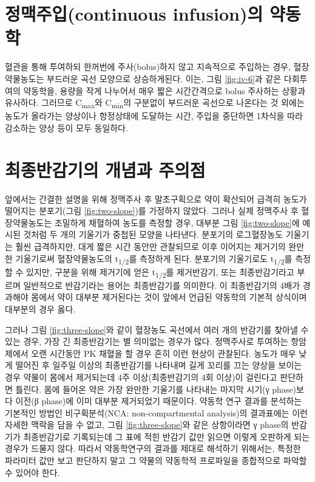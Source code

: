 \documentclass[
  11pt,
  krantz2, a4paper, twoside]{krantz}
\begin{document}
\hypertarget{uxc815uxb9e5uxc8fcuxc785continuous-infusionuxc758-uxc57duxb3d9uxd559}{%
\section{정맥주입(continuous infusion)의 약동학}\label{uxc815uxb9e5uxc8fcuxc785continuous-infusionuxc758-uxc57duxb3d9uxd559}}

혈관을 통해 투여하되 한꺼번에 주사(bolus)하지 않고 지속적으로 주입하는
경우, 혈장약물농도는 부드러운 곡선 모양으로 상승하게된다. 이는, 그림 \ref{fig:iv-6}과 같은 다회투여의 약동학을, 용량을 작게 나누어서 매우 짧은
시간간격으로 bolus 주사하는 상황과 유사하다. 그러므로 C\textsubscript{max}와 C\textsubscript{min}의
구분없이 부드러운 곡선으로 나온다는 것 외에는 농도가 올라가는 양상이나
항정상태에 도달하는 시간, 주입을 중단하면 1차식을 따라 감소하는 양상
등이 모두 동일하다.

\hypertarget{uxcd5cuxc885uxbc18uxac10uxae30uxc758-uxac1cuxb150uxacfc-uxc8fcuxc758uxc810}{%
\section{최종반감기의 개념과 주의점}\label{uxcd5cuxc885uxbc18uxac10uxae30uxc758-uxac1cuxb150uxacfc-uxc8fcuxc758uxc810}}

앞에서는 간결한 설명을 위해 정맥주사 후 말초구획으로 약이 확산되어
급격히 농도가 떨어지는 분포기(그림 \ref{fig:two-slope})를 가정하지 않았다. 그러나 실제
정맥주사 후 혈장약물농도는 조밀하게 채혈하여 농도를 측정할 경우, 대부분
그림 \ref{fig:two-slope}에 예시된 것처럼 두 개의 기울기가 중첩된 모양을 나타낸다.
분포기의 로그혈장농도 기울기는 훨씬 급격하지만, 대게 짧은 시간 동안만
관찰되므로 이후 이어지는 제거기의 완만한 기울기로써 혈장약물농도의
t\textsubscript{1/2}를 측정하게 된다. 분포기의 기울기로도 t\textsubscript{1/2}를 측정할 수 있지만,
구분을 위해 제거기에 얻은 t\textsubscript{1/2}를 제거반감기, 또는 최종반감기라고
부르며 일반적으로 반감기라는 용어는 최종반감기를 의미한다. 이
최종반감기의 4배가 경과해야 몸에서 약이 대부분 제거된다는 것이 앞에서
언급된 약동학의 기본적 상식이며 대부분의 경우 옳다.

그러나 그림 \ref{fig:three-slope}와 같이 혈장농도 곡선에서 여러 개의 반감기를 찾아낼 수
있는 경우, 가장 긴 최종반감기는 별 의미없는 경우가 많다. 정맥주사로
투여하는 항암제에서 오랜 시간동안 PK 채혈을 할 경우 흔히 이런 현상이
관찰된다. 농도가 매우 낮게 떨어진 후 일주일 이상의 최종반감기를 나타내며
길게 꼬리를 끄는 양상을 보이는 경우 약물이 몸에서 제거되는데 4주
이상(최종반감기의 4회 이상)이 걸린다고 판단하면 틀린다. 몸에 들어온 약은
가장 완만한 기울기를 나타내는 마지막 시기(γ phase)보다 이전(β phase)에
이미 대부분 제거되었기 때문이다. 약동학 연구 결과를 분석하는 기본적인
방법인 비구획분석(NCA: non-compartmental analysis)의 결과표에는 이런
자세한 맥락을 담을 수 없고, 그림 \ref{fig:three-slope}와 같은 상항이라면 γ phase의
반감기가 최종반감기로 기록되는데 그 표에 적힌 반감기 값만 읽으면 이렇게
오판하게 되는 경우가 드물지 않다. 따라서 약동학연구의 결과를 제대로
해석하기 위해서는, 특정한 파라미터 값만 보고 판단하지 말고 그 약물의
약동학적 프로파일을 종합적으로 파악할 수 있어야 한다.
\end{document}
